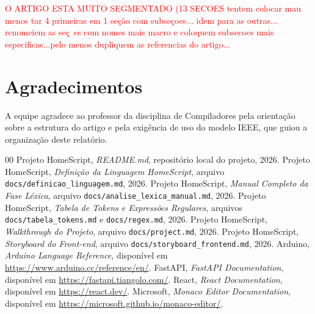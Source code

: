 \documentclass[conference]{IEEEtran}
\begin{document}
\textcolor{red}{O ARTIGO ESTA MUITO SEGMENTADO (13 SECOES tentem colocar mau menos tar 4 primeiras em 1 seção com subseçoes... idem para as outras... renomeiem as seç~es com nomes mais macro e coloquem subsecoes mais especificas...pelo menos dupliquem as referencias do artigo...}

\section*{Agradecimentos}
A equipe agradece ao professor da disciplina de Compiladores pela orientação sobre a estrutura do artigo e pela exigência de uso do modelo IEEE, que guiou a organização deste relatório.

\balance
\begin{thebibliography}{00}
 Projeto HomeScript, \textit{README.md}, repositório local do projeto, 2026.
 Projeto HomeScript, \textit{Definição da Linguagem HomeScript}, arquivo \texttt{docs/definicao\_linguagem.md}, 2026.
 Projeto HomeScript, \textit{Manual Completo da Fase Léxica}, arquivo \texttt{docs/analise\_lexica\_manual.md}, 2026.
 Projeto HomeScript, \textit{Tabela de Tokens e Expressões Regulares}, arquivos \texttt{docs/tabela\_tokens.md} e \texttt{docs/regex.md}, 2026.
 Projeto HomeScript, \textit{Walkthrough do Projeto}, arquivo \texttt{docs/project.md}, 2026.
 Projeto HomeScript, \textit{Storyboard do Front-end}, arquivo \texttt{docs/storyboard\_frontend.md}, 2026.
 Arduino, \textit{Arduino Language Reference}, disponível em \url{https://www.arduino.cc/reference/en/}.
 FastAPI, \textit{FastAPI Documentation}, disponível em \url{https://fastapi.tiangolo.com/}.
 React, \textit{React Documentation}, disponível em \url{https://react.dev/}.
 Microsoft, \textit{Monaco Editor Documentation}, disponível em \url{https://microsoft.github.io/monaco-editor/}.
\end{thebibliography}
\end{document}
